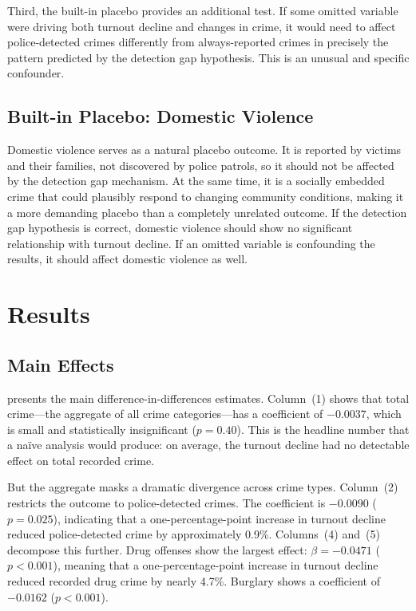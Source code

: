 \documentclass[12pt]{article}
\begin{document}
Third, the built-in placebo provides an additional test. If some omitted variable were driving both turnout decline and changes in crime, it would need to affect police-detected crimes differently from always-reported crimes in precisely the pattern predicted by the detection gap hypothesis. This is an unusual and specific confounder.

\subsection{Built-in Placebo: Domestic Violence}

Domestic violence serves as a natural placebo outcome. It is reported by victims and their families, not discovered by police patrols, so it should not be affected by the detection gap mechanism. At the same time, it is a socially embedded crime that could plausibly respond to changing community conditions, making it a more demanding placebo than a completely unrelated outcome. If the detection gap hypothesis is correct, domestic violence should show no significant relationship with turnout decline. If an omitted variable is confounding the results, it should affect domestic violence as well.


\section{Results}\label{sec:results}

\subsection{Main Effects}

 presents the main difference-in-differences estimates. Column~(1) shows that total crime---the aggregate of all crime categories---has a coefficient of $-0.0037$, which is small and statistically insignificant ($p = 0.40$). This is the headline number that a na\"ive analysis would produce: on average, the turnout decline had no detectable effect on total recorded crime.

But the aggregate masks a dramatic divergence across crime types. Column~(2) restricts the outcome to police-detected crimes. The coefficient is $-0.0090$ ($p = 0.025$), indicating that a one-percentage-point increase in turnout decline reduced police-detected crime by approximately 0.9\%. Columns~(4) and~(5) decompose this further. Drug offenses show the largest effect: $\beta = -0.0471$ ($p < 0.001$), meaning that a one-percentage-point increase in turnout decline reduced recorded drug crime by nearly 4.7\%. Burglary shows a coefficient of $-0.0162$ ($p < 0.001$).
\end{document}
